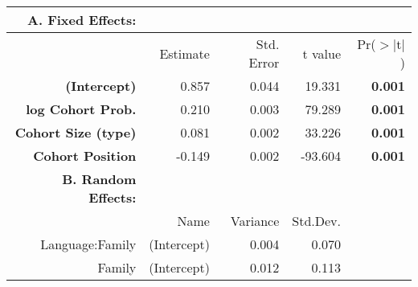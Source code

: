 \begin{tabular}{rrrrr}
 {\bf A. Fixed Effects:} \\
\hline
 & Estimate & Std. Error & t value & Pr($>$$|$t$|$) \\ 
  \hline
{\bf (Intercept)} & 0.857 & 0.044 & 19.331 & {\bf 0.001} \\ 
 {\bf log Cohort Prob.} & 0.210 & 0.003 & 79.289 & {\bf 0.001} \\ 
 {\bf Cohort Size (type)} & 0.081 & 0.002 & 33.226 & {\bf 0.001} \\ 
 {\bf Cohort Position} & -0.149 & 0.002 & -93.604 & {\bf 0.001} \\ 

\hline \hline
{\bf B. Random Effects:} \\
\hline
& Name & Variance & Std.Dev. \\
\hline
Language:Family & (Intercept) & 0.004 & 0.070 \\
Family & (Intercept) & 0.012 & 0.113 \\
\end{tabular}
